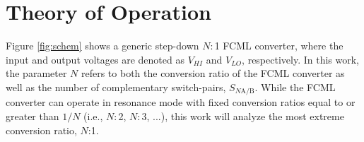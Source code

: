 



\vspace{-15pt}
\section{Theory of Operation}
\vspace{-0.75em}
Figure \ref{fig:schem} shows a generic step-down $N$:\,1 FCML converter, where the input and output voltages are denoted as $V_{HI}$ and $V_{LO}$, respectively.
In this work, the parameter $N$ refers to both the conversion ratio of the FCML converter as well as the number of complementary switch-pairs, $S_{N\textrm{A/B}}$.
While the FCML converter can operate in resonance mode with fixed conversion ratios equal to or greater than $1/N$ (i.e., $N$:\,2, $N$:\,3, ...), this work will analyze the most extreme conversion ratio, $N$:1.


